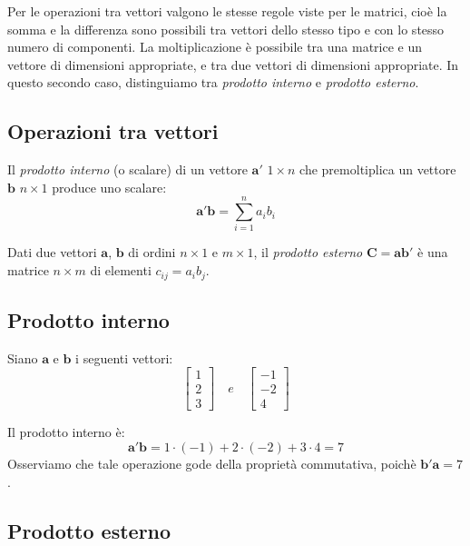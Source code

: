 Per le operazioni tra vettori valgono le stesse regole viste per le matrici, cio{\`e} la somma e la differenza sono possibili tra vettori dello stesso tipo e con lo stesso numero di componenti. La moltiplicazione {\`e} possibile tra una matrice e un
vettore di dimensioni appropriate, e tra due vettori di dimensioni
appropriate. In questo secondo caso, distinguiamo tra \emph{prodotto interno} e \emph{prodotto esterno}.

\subsection{Operazioni tra vettori}

Il \emph{prodotto interno} (o scalare) di un vettore
$\boldsymbol{a}'$ $1 \times n$ che premoltiplica un vettore
$\boldsymbol{b}$ $n \times 1$ produce uno scalare:
$$
\boldsymbol{a}'\boldsymbol{b} = \sum_{i=1}^{n}a_i b_i
$$

Dati due vettori $\boldsymbol{a}$, $\boldsymbol{b}$ di ordini $n
\times 1$ e $m \times 1$, il \emph{prodotto esterno}
$\boldsymbol{C} = \boldsymbol{ab}'$ {\`e} una matrice $n \times m$ di
elementi $c_{ij} = a_i b_j$.

\subsection{Prodotto interno}

Siano $\boldsymbol{a}$ e $\boldsymbol{b}$ i seguenti vettori:
\begin{displaymath}
\left[ \begin{array}{c}
1 \\
2 \\
3
\end{array}
 \right] \quad e \quad
\left[ \begin{array}{c}
-1 \\
-2 \\
4
\end{array}
 \right]
\end{displaymath}

Il prodotto interno {\`e}:
\[
\boldsymbol{a}'\boldsymbol{b}= 1 \cdot (-1) + 2 \cdot (-2) + 3
\cdot 4 = 7
\]
Osserviamo che tale operazione gode della propriet{\`a}
commutativa, poich{\`e} $\boldsymbol{b}'\boldsymbol{a}=7$.

\subsection{Prodotto esterno}

